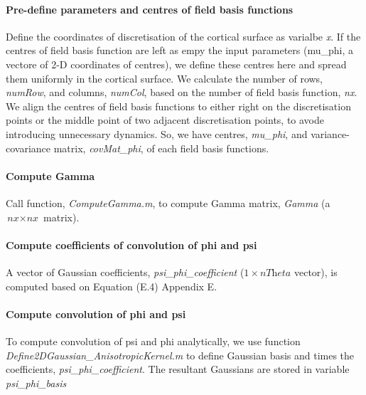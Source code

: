 \documentclass[a4paper, 12pt, english]{article}
\begin{document}
\paragraph{Pre-define parameters and centres of field basis functions\newline}
Define the coordinates of discretisation of the cortical surface as varialbe \textit{x}. If the centres of field basis function are left as empy the input parameters (mu\_phi, a
vectore of 2-D coordinates of centres), we define these centres here and spread them
uniformly in the cortical surface. \newline
We calculate the number of rows, \textit{numRow}, and columns, \textit{numCol}, based on the
number of field basis function, \textit{nx}.\newline
We align the centres of field basis functions to either right on the
discretisation points or the middle point of two adjacent discretisation
points, to avode introducing unnecessary dynamics. \newline
So, we have centres, \textit{mu\_phi}, and variance-covariance matrix, \textit{covMat\_phi},
of each field basis functions.\newline
\paragraph{Compute Gamma\newline}
Call function, \textit{ComputeGamma.m}, to compute Gamma matrix, \textit{Gamma} (a \(\textit{nx}\times
\textit{nx}\) matrix).\newline

\paragraph{Compute coefficients of convolution of phi and psi\newline}
A vector of Gaussian coefficients, \textit{psi\_phi\_coefficient} (\(1\times\textit{nTheta}\) vector), is computed based on Equation
(E.4) Appendix E.

\paragraph{Compute convolution of phi and psi\newline}
To compute convolution of psi and phi analytically, we use function \textit{Define2DGaussian\_AnisotropicKernel.m}
to define Gaussian basis and times the coefficients, \textit{psi\_phi\_coefficient}.
The resultant Gaussians are stored in variable \textit{psi\_phi\_basis}
\end{document}
